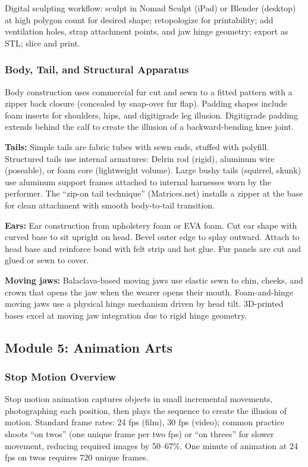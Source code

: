 \documentclass[11pt,letterpaper]{article}
\begin{document}
Digital sculpting workflow: sculpt in Nomad Sculpt (iPad) or Blender (desktop) at high polygon count for desired shape; retopologize for printability; add ventilation holes, strap attachment points, and jaw hinge geometry; export as STL; slice and print.

\subsubsection{Body, Tail, and Structural Apparatus}

Body construction uses commercial fur cut and sewn to a fitted pattern with a zipper back closure (concealed by snap-over fur flap). Padding shapes include foam inserts for shoulders, hips, and digitigrade leg illusion. Digitigrade padding extends behind the calf to create the illusion of a backward-bending knee joint.

\textbf{Tails:} Simple tails are fabric tubes with sewn ends, stuffed with polyfill. Structured tails use internal armatures: Delrin rod (rigid), aluminum wire (poseable), or foam core (lightweight volume). Large bushy tails (squirrel, skunk) use aluminum support frames attached to internal harnesses worn by the performer. The ``zip-on tail technique'' (Matrices.net) installs a zipper at the base for clean attachment with smooth body-to-tail transition.

\textbf{Ears:} Ear construction from upholstery foam or EVA foam. Cut ear shape with curved base to sit upright on head. Bevel outer edge to splay outward. Attach to head base and reinforce bond with felt strip and hot glue. Fur panels are cut and glued or sewn to cover.

\textbf{Moving jaws:} Balaclava-based moving jaws use elastic sewn to chin, cheeks, and crown that opens the jaw when the wearer opens their mouth. Foam-and-hinge moving jaws use a physical hinge mechanism driven by head tilt. 3D-printed bases excel at moving jaw integration due to rigid hinge geometry.

\subsection{Module 5: Animation Arts}

\subsubsection{Stop Motion Overview}

Stop motion animation captures objects in small incremental movements, photographing each position, then plays the sequence to create the illusion of motion. Standard frame rates: 24 fps (film), 30 fps (video); common practice shoots ``on twos'' (one unique frame per two fps) or ``on threes'' for slower movement, reducing required images by 50--67\%. One minute of animation at 24 fps on twos requires 720 unique frames.
\end{document}

